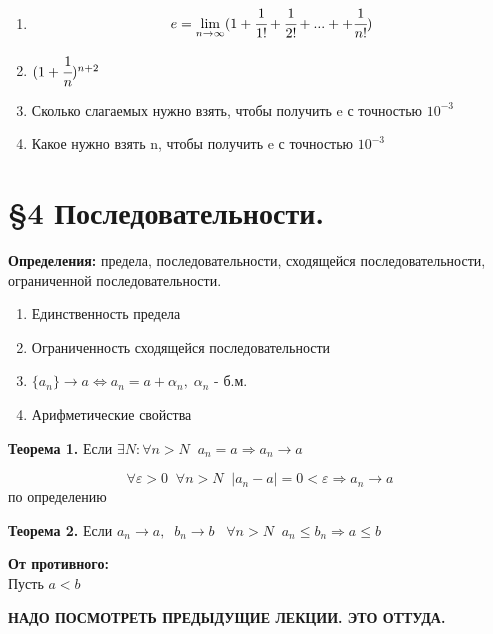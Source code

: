 \documentclass[12pt, a4paper]{article}
\begin{document}
\begin{tcolorbox}[title=Доказать/подумать]
    \begin{enumerate}
        \item \[ e = \lim_{n\to\infty} (1+\cfrac{1}{1!} +\cfrac{1}{2!} + ... + +\cfrac{1}{n!}) \]
        \item $(1+\cfrac{1}{n})^{n+2}$
        \item Сколько слагаемых нужно взять, чтобы получить e с точностью $10^{-3}$\\
        \item Какое нужно взять n, чтобы получить e с точностью $10^{-3}$
    \end{enumerate}
\end{tcolorbox}

\section{\S4 Последовательности.}
\begin{tcolorbox}
    \textbf{Определения:} предела, последовательности, сходящейся последовательности, ограниченной последовательности.
\end{tcolorbox}

\begin{tcolorbox}[title=Теоремы ]
    \begin{enumerate}
        \item Единственность предела
        \item Ограниченность сходящейся последовательности
        \item $\{a_n\} \to a \Leftrightarrow a_n = a + \alpha_n,\; \alpha_n$ - б.м.
        \item Арифметические свойства
    \end{enumerate}
\end{tcolorbox}

\begin{tcolorbox}
    \textbf{Теорема 1.} Если $\exists N: \forall n > N \;\; a_n = a \Rightarrow a_n\to a$
\end{tcolorbox}
\begin{tcolorbox}[title=Доказательство]
    \[ \forall \varepsilon>0 \;\;\forall n>N \;\; |a_n - a| = 0 < \varepsilon \Rightarrow a_n\to a\] по определению 
\end{tcolorbox}

\begin{tcolorbox}
    \textbf{Теорема 2.} Если $ a_n\to a,\;\; b_n\to b \;\;\;\forall n > N \;\; a_n \leq b_n \Rightarrow a\leq b $
\end{tcolorbox}
\begin{tcolorbox}[title=Доказательство]
    \textbf{От противного:}\\ 
    Пусть $ a < b$
\end{tcolorbox}
\textbf{НАДО ПОСМОТРЕТЬ ПРЕДЫДУЩИЕ ЛЕКЦИИ. ЭТО ОТТУДА.}
\end{document}
